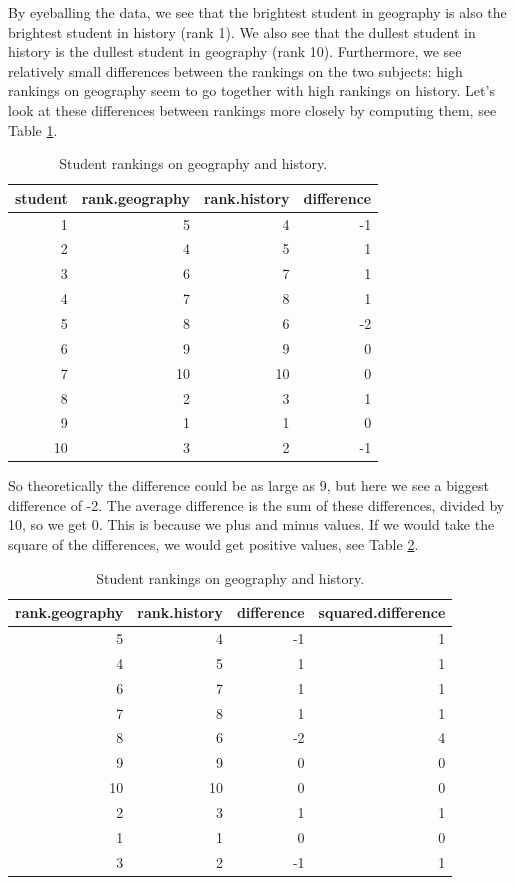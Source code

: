 \documentclass[]{book}\usepackage[]{graphicx}\usepackage[]{color}
\begin{document}
By eyeballing the data, we see that the brightest student in geography is also the brightest student in history (rank 1). We also see that the dullest student in history is the dullest student in geography (rank 10). Furthermore, we see relatively small differences between the rankings on the two subjects: high rankings on geography seem to go together with high rankings on history. Let's look at these differences between rankings more closely by computing them, see Table \ref{tab:nonpar_4}.

\begin{table}[ht]
\centering
\caption{Student rankings on geography and history.} 
\label{tab:nonpar_4}
\begin{tabular}{rrrr}
  \hline
student & rank.geography & rank.history & difference \\ 
  \hline
1 & 5 & 4 & -1 \\ 
  2 & 4 & 5 & 1 \\ 
  3 & 6 & 7 & 1 \\ 
  4 & 7 & 8 & 1 \\ 
  5 & 8 & 6 & -2 \\ 
  6 & 9 & 9 & 0 \\ 
  7 & 10 & 10 & 0 \\ 
  8 & 2 & 3 & 1 \\ 
  9 & 1 & 1 & 0 \\ 
  10 & 3 & 2 & -1 \\ 
   \hline
\end{tabular}
\end{table}


So theoretically the difference could be as large as 9, but here we see a biggest difference of -2. The average difference is the sum of these differences, divided by 10, so we get 0. This is because we plus and minus values. If we would take the square of the differences, we would get positive values, see Table \ref{tab:nonpar_5}.

\begin{table}[ht]
\centering
\caption{Student rankings on geography and history.} 
\label{tab:nonpar_5}
\begin{tabular}{rrrr}
  \hline
rank.geography & rank.history & difference & squared.difference \\ 
  \hline
5 & 4 & -1 & 1 \\ 
  4 & 5 & 1 & 1 \\ 
  6 & 7 & 1 & 1 \\ 
  7 & 8 & 1 & 1 \\ 
  8 & 6 & -2 & 4 \\ 
  9 & 9 & 0 & 0 \\ 
  10 & 10 & 0 & 0 \\ 
  2 & 3 & 1 & 1 \\ 
  1 & 1 & 0 & 0 \\ 
  3 & 2 & -1 & 1 \\ 
   \hline
\end{tabular}
\end{table}
\end{document}

